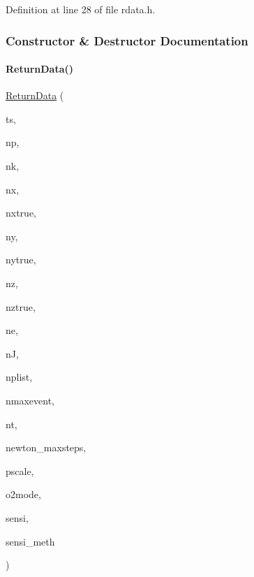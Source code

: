 Definition at line 28 of file rdata.\+h.



\subsubsection{Constructor \& Destructor Documentation}
\mbox{\label{classamici_1_1_return_data_a8a1111d7dbceb11f6c6d8aa7bbacfd7d}} 
\paragraph{\texorpdfstring{Return\+Data()}{ReturnData()}\hspace{0.1cm}{\footnotesize\ttfamily [1/2]}}
{\footnotesize\ttfamily \mbox{\hyperlink{classamici_1_1_return_data}{Return\+Data}} (\begin{DoxyParamCaption}\item[{std\+::vector$<$ \mbox{\hyperlink{namespaceamici_a1bdce28051d6a53868f7ccbf5f2c14a3}{realtype}} $>$}]{ts,  }\item[{int}]{np,  }\item[{int}]{nk,  }\item[{int}]{nx,  }\item[{int}]{nxtrue,  }\item[{int}]{ny,  }\item[{int}]{nytrue,  }\item[{int}]{nz,  }\item[{int}]{nztrue,  }\item[{int}]{ne,  }\item[{int}]{nJ,  }\item[{int}]{nplist,  }\item[{int}]{nmaxevent,  }\item[{int}]{nt,  }\item[{int}]{newton\+\_\+maxsteps,  }\item[{std\+::vector$<$ \mbox{\hyperlink{namespaceamici_a42f062082226e9284c201d9eab71a3a0}{Parameter\+Scaling}} $>$}]{pscale,  }\item[{\mbox{\hyperlink{namespaceamici_a2d77779286167d5603a870bf9f6c21ba}{Second\+Order\+Mode}}}]{o2mode,  }\item[{\mbox{\hyperlink{namespaceamici_aaa03ec2f8c4d5323b98d71134a462fda}{Sensitivity\+Order}}}]{sensi,  }\item[{\mbox{\hyperlink{namespaceamici_aa0fa493529f6872e7e776b91fbbf38f9}{Sensitivity\+Method}}}]{sensi\+\_\+meth }\end{DoxyParamCaption})}


